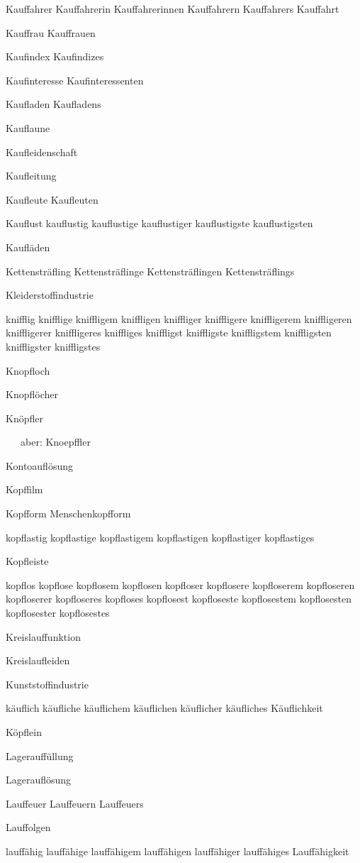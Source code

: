 Kauffahrer Kauffahrerin Kauffahrerinnen Kauffahrern Kauffahrers
Kauffahrt

Kauffrau Kauffrauen

Kaufindex Kaufindizes

Kaufinteresse Kaufinteressenten

Kaufladen Kaufladens

Kauflaune

Kaufleidenschaft

Kaufleitung

Kaufleute Kaufleuten

Kauflust kauflustig kauflustige kauflustiger kauflustigste kauflustigsten

Kaufläden

Kettensträfling Kettensträflinge Kettensträflingen Kettensträflings

Kleiderstoffindustrie

knifflig knifflige kniffligem kniffligen kniffliger kniffligere kniffligerem kniffligeren kniffligerer kniffligeres kniffliges kniffligst kniffligste kniffligstem kniffligsten kniffligster kniffligstes

Knopfloch

Knopflöcher

Knöpfler

\ \ \ aber: Knoepffler

Kontoauflösung

Kopffilm

Kopfform Menschenkopfform

kopflastig kopflastige kopflastigem kopflastigen kopflastiger kopflastiges

Kopfleiste

kopflos kopflose kopflosem kopflosen kopfloser kopflosere kopfloserem kopfloseren kopfloserer kopfloseres kopfloses kopflosest kopfloseste kopflosestem kopflosesten kopflosester kopflosestes

Kreislauffunktion

Kreislaufleiden

Kunststoffindustrie

käuflich käufliche käuflichem käuflichen käuflicher käufliches Käuflichkeit

Köpflein

Lagerauffüllung

Lagerauflösung

Lauffeuer Lauffeuern Lauffeuers

Lauffolgen

lauffähig lauffähige lauffähigem lauffähigen lauffähiger lauffähiges Lauffähigkeit

